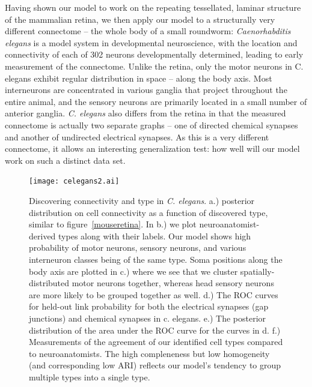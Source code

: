 \documentclass{article}
\begin{document}
Having shown our model to work on the repeating tessellated, laminar structure of the mammalian retina, we then apply our model to a structurally very different connectome -- the whole body of a small roundworm: 
\textit{Caenorhabditis elegans} is a model system in
developmental neuroscience\autocite{White1986}, with the location and
connectivity of each of 302 neurons developmentally determined,
leading to early measurement of the connectome. Unlike the retina,
only the motor neurons in C. elegans exhibit regular distribution in
space -- along the body axis. Most interneurons are
concentrated in various ganglia that project throughout the entire
animal, and the sensory neurons are primarily located in a small
number of anterior ganglia. \textit{C. elegans} also differs from the retina in that the measured connectome is actually two separate graphs -- one of directed chemical synapses and another of undirected electrical synapses. As this is a very different connectome, it allows an interesting generalization test: how well will our model work on such a distinct data set.


\begin{figure}
  \centering 
  \centerline{\texttt{[image: celegans2.ai]}}
  \caption{Discovering connectivity and type in
    \textit{C. elegans}. a.) posterior distribution on cell
    connectivity as a function of discovered type, similar to
    figure~\ref{mouseretina}. In b.) we plot neuroanatomist-derived
    types along with their labels. Our model shows high probability of
    motor neurons, sensory neurons, and various interneuron classes
    being of the same type. Soma positions along the body axis are
    plotted in c.) where we see that we cluster spatially-distributed
    motor neurons together, whereas head sensory neurons are more
    likely to be grouped together as well.  d.) The ROC curves for
    held-out link probability for both the electrical synapses (gap
    junctions) and chemical synapses in c. elegans. e.) The posterior
    distribution of the area under the ROC curve for the curves in
    d. f.) Measurements of the agreement of our identified cell types
    compared to neuroanatomists. The high compleneness but low
    homogeneity (and corresponding low ARI) reflects our model's
    tendency to group multiple types into a single type.}
  \label{fig:celegans}
\end{figure}
\end{document}

